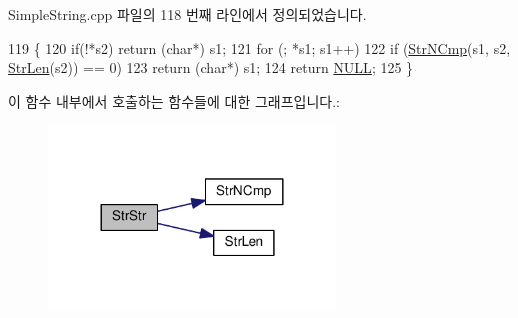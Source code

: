 Simple\+String.\+cpp 파일의 118 번째 라인에서 정의되었습니다.


\begin{DoxyCode}
119 \{
120     \textcolor{keywordflow}{if}(!*s2) \textcolor{keywordflow}{return} (\textcolor{keywordtype}{char}*) s1;
121     \textcolor{keywordflow}{for} (; *s1; s1++)
122         \textcolor{keywordflow}{if} (\hyperlink{class_simple_string_aa5c40b33a4812fdf30ee3e37e3f381b2}{StrNCmp}(s1, s2, \hyperlink{class_simple_string_a867ba0eaff866a8b87c33ece7e09a8fa}{StrLen}(s2)) == 0)
123             \textcolor{keywordflow}{return} (\textcolor{keywordtype}{char}*) s1;
124     \textcolor{keywordflow}{return} \hyperlink{openavb__types__base__pub_8h_a070d2ce7b6bb7e5c05602aa8c308d0c4}{NULL};
125 \}
\end{DoxyCode}


이 함수 내부에서 호출하는 함수들에 대한 그래프입니다.\+:
\nopagebreak
\begin{figure}[H]
\begin{center}
\leavevmode
\includegraphics[width=216pt]{class_simple_string_aa4de2381337817616753c064899f257d_cgraph}
\end{center}
\end{figure}





